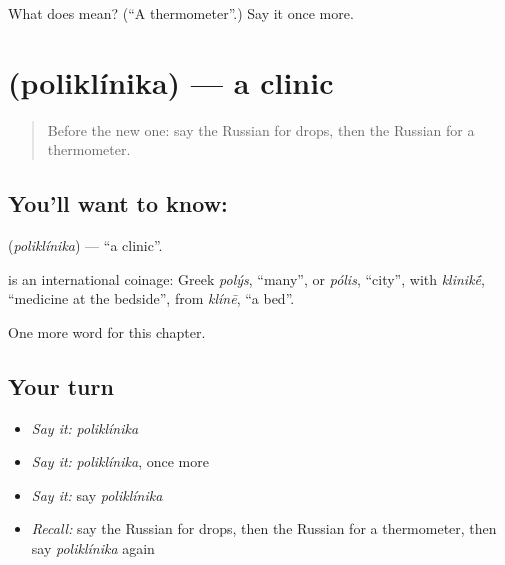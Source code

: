\begin{tcolorbox}[breakable,colback=teal!4,colframe=teal!35!black,title={Before you move on}]
What does  mean? (\textquotedblleft{}A thermometer\textquotedblright{}.) Say it once more.
\end{tcolorbox}
\section[\texorpdfstring{\ru{поликлиника} (poliklínika)}{поликлиника (poliklínika)}]{ (poliklínika) — a clinic}

\label{lesson:RU-C238-poliklinika}



\begin{quote}
Before the new one: say the Russian for drops, then the Russian for a thermometer.
\end{quote}

\subsection*{You'll want to know: }
\textbf{} (\emph{poliklínika}) — \textquotedblleft{}a clinic\textquotedblright{}.

\begin{cousinweb}
\textbf{} is an international coinage: Greek \emph{polýs}, \textquotedblleft{}many\textquotedblright{}, or \emph{pólis}, \textquotedblleft{}city\textquotedblright{}, with \emph{klinik\'{\={e}}}, \textquotedblleft{}medicine at the bedside\textquotedblright{}, from \emph{klínē}, \textquotedblleft{}a bed\textquotedblright{}.
\end{cousinweb}

\begin{grammarlens}[title={What you've built}]
One more word for this chapter.
\end{grammarlens}

\subsection*{Your turn}
\begin{itemize}
\raggedright
  \item \emph{Say it:} \emph{poliklínika}
  \item \emph{Say it:} \emph{poliklínika}, once more
  \item \emph{Say it:} say \emph{poliklínika}
  \item \emph{Recall:} say the Russian for drops, then the Russian for a thermometer, then say \emph{poliklínika} again
\end{itemize}

